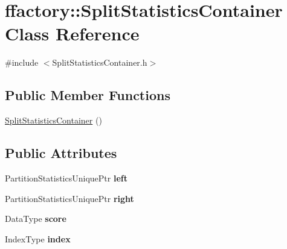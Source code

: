 \hypertarget{classffactory_1_1_split_statistics_container}{\section{ffactory\-:\-:Split\-Statistics\-Container Class Reference}
\label{classffactory_1_1_split_statistics_container}
}


{\ttfamily \#include $<$Split\-Statistics\-Container.\-h$>$}

\subsection*{Public Member Functions}
\begin{DoxyCompactItemize}
\item 
\hyperlink{classffactory_1_1_split_statistics_container_a83fd03162751dd8b7a39629c56594a1d}{Split\-Statistics\-Container} ()
\end{DoxyCompactItemize}
\subsection*{Public Attributes}
\begin{DoxyCompactItemize}
\item 
\hypertarget{classffactory_1_1_split_statistics_container_ac4ff3d7ee3b37cc873f1819fa5c21671}{Partition\-Statistics\-Unique\-Ptr {\bfseries left}}\label{classffactory_1_1_split_statistics_container_ac4ff3d7ee3b37cc873f1819fa5c21671}

\item 
\hypertarget{classffactory_1_1_split_statistics_container_aeec147bf1679f5c48fe3bb529911f452}{Partition\-Statistics\-Unique\-Ptr {\bfseries right}}\label{classffactory_1_1_split_statistics_container_aeec147bf1679f5c48fe3bb529911f452}

\item 
\hypertarget{classffactory_1_1_split_statistics_container_a0d0b58763e6e31cb6aaeff7443f1c259}{Data\-Type {\bfseries score}}\label{classffactory_1_1_split_statistics_container_a0d0b58763e6e31cb6aaeff7443f1c259}

\item 
\hypertarget{classffactory_1_1_split_statistics_container_a61ec4078241bd1b508c6e562fde26725}{Index\-Type {\bfseries index}}\label{classffactory_1_1_split_statistics_container_a61ec4078241bd1b508c6e562fde26725}

\end{DoxyCompactItemize}


